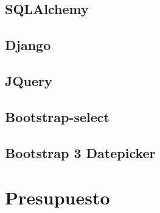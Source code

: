 \section{SQLAlchemy}

\section{Django}

\section{JQuery}

\section{Bootstrap-select}

\section{Bootstrap 3 Datepicker}

\chapter{Presupuesto}





\clearpage

